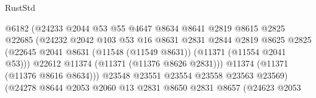\begin{lexlean}{RustStd}
\begin{coremodule}
                                          @6182
                                          (@24233
                                            @2044
                                            @53
                                            @55
                                            @4647
                                            @8634
                                            @8641
                                            @2819
                                            @8615
                                            @2825
                                            @22685
                                            (@24232
                                              @2042
                                              @103
                                              @53
                                              @16
                                              @8631
                                              @2831
                                              @2844
                                              @2819
                                              @8625
                                              @2825
                                              (@22645
                                                @2041
                                                @8631
                                                (@11548 (@11549 @8631))
                                                (@11371 (@11554 @2041 @53)))
                                              @22612
                                              @11374
                                              (@11371 (@11376 @8626 @2831)))
                                            @11374
                                            (@11371 (@11376 @8616 @8634)))
                                          @23548
                                          @23551
                                          @23554
                                          @23558
                                          @23563
                                          @23569)
                                        (@24278
                                          @8644
                                          @2053
                                          @2060
                                          @13
                                          @2831
                                          @8650
                                          @2831
                                          @8657
                                          (@24623
                                            @2053

\end{coremodule}
\end{lexlean}
